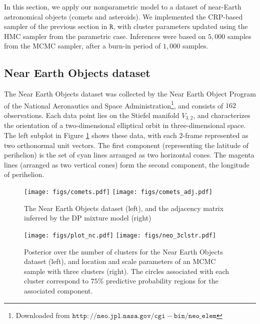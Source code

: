 In this section, we apply our nonparametric model to a dataset of near-Earth astronomical objects (comets and asteroids).
We implemented the CRP-based sampler of the previous section in $\mathtt{R}$, with cluster parameters updated using the HMC sampler from the parametric case.
Inferences were based on $5,000$ samples from the MCMC sampler, after a burn-in period of $1,000$ samples.

\subsection{Near Earth Objects dataset}
The Near Earth Objects dataset was collected by the
Near Earth Object Program of the National Aeronautics and Space Administration\footnote{Downloaded from
$\mathtt{http://neo.jpl.nasa.gov/cgi-bin/neo\_elem}$}, and consists of $162$ observations. Each data point
lies on the Stiefel manifold $V_{3,2}$, and characterizes the orientation of a two-dimensional elliptical orbit in
three-dimensional space.
The left subplot in Figure \ref{fig:neo_data} shows these data, with each $2$-frame represented as two orthonormal unit vectors.
The first component (representing the latitude of perihelion) is the set of cyan lines arranged as two horizontal cones.
The magenta lines (arranged as two vertical cones) form the second component, the longitude of perihelion.
  \begin{figure}
  \centering
    \texttt{[image: figs/comets.pdf]}
  \centering
    \texttt{[image: figs/comets\_adj.pdf]}
\caption{The Near Earth Objects dataset (left), and the adjacency matrix inferred by the DP mixture model (right)}
  \label{fig:neo_data}
  \end{figure}
  \begin{figure}
  \centering
    \texttt{[image: figs/plot\_nc.pdf]}
  \centering
    \texttt{[image: figs/neo\_3clstr.pdf]}
\caption{Posterior over the number of clusters for the Near Earth Objects dataset (left), and location and scale parameters of an MCMC sample with
three clusters (right). The circles associated with each cluster correspond to $75\%$ predictive probability regions for the associated component.}
  \label{fig:post_nc}
  \end{figure}


